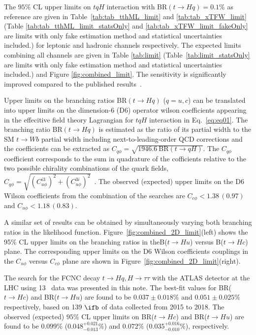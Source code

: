 The $95\%$ CL upper limits on $tqH$ interaction with BR$(t\to Hq)=0.1\%$ as reference are given in Table~\ref{tab:tab_tthML_limit} and \ref{tab:tab_xTFW_limit} (Table \ref{tab:tab_tthML_limit_statsOnly} and \ref{tab:tab_xTFW_limit_fakeOnly} are limits with only fake estimation method and statistical uncertainties included.) for leptonic and hadronic channels respectively. The expected limits combining all channels are given in Table \ref{tab:limit} (Table~\ref{tab:limit_statsOnly} are limits with only fake estimation method and statistical uncertainties included.) and Figure \ref{fig:combined_limit}. The sensitivity is significantly improved compared to the published results~\cite{fcncgmgm,fcncml,fcnctautau}. 

Upper limits on the branching ratios BR$(t\to Hq)$ ($q=u,c$) can be translated into upper limits on the dimension-6 (D6) operator wilson coefficients appearing in the effecitive field theory Lagrangian for $tqH$ interaction in Eq.~\ref{eq:eq01}.
The branching ratio BR$(t\to Hq)$ is estimated as the ratio of its partial width to the SM $t \to Wb$ partial width including next-to-leading-order QCD corrections and the coefficients can be extracted as $C_{q\phi} = \sqrt{1946.6~\text{BR}(t\to qH)}$.
The $C_{q\phi}$ coefficient corresponds to the sum in quadrature of the cofficients relative to the two possible chirality combinations of the quark fields,
$C_{q\phi} =\sqrt{(C^{i3}_{u\phi})^2 + (C^{3i}_{u\phi})^2}$~\cite{fcnc_production_theory}. The observed (expected) upper limits on the D6 Wilson coefficients from the combination of the searches are $C_{c\phi}<1.38\,(0.97)$ and $C_{u\phi}<1.18\,(0.83)$.

A similar set of results can be obtained by simultaneously varying both branching ratios in the likelihood function. Figure~\ref{fig:combined_2D_limit}(left) shows the 95\% CL upper limits on the branching ratios in theB($t\rightarrow Hu$)
versus B($t\rightarrow Hc$) plane. The corresponding upper limits on the D6 Wilson coefficients couplings in the $C_{u\phi}$ versus $C_{c\phi}$ plane are shown in Figure~\ref{fig:combined_2D_limit}(right).

The search for the FCNC decay $t\to Hq, H\to\tau\tau$ with the ATLAS detector at the LHC using 13~\TeV{} data was presented in this note. The best-fit values for BR($t\to Hc$) and BR($t\to Hu$) are found to be $0.037\pm0.018\%$ and $0.051\pm0.025\%$ respectively, based on 139 $\ifb$ of data collected from 2015 to 2018. The observed (expected) $95\%$ CL upper limits on BR($t\to Hc$) and BR($t\to Hu$) are found to be $0.099\%$ ($0.048^{+0.021}_{-0.013}\%$) and $0.072\%$ ($0.035^{+0.016}_{-0.010}\%$), respectively.


